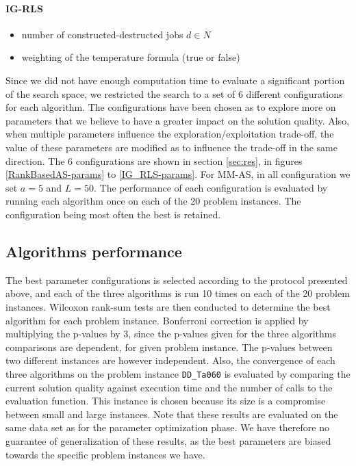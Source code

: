 \documentclass[runningheads]{llncs}
\begin{document}
\paragraph{IG-RLS}
\begin{itemize}
	\item number of constructed-destructed jobs $d\in N$
	\item weighting of the temperature formula (true or false)
\end{itemize}

Since we did not have enough computation time to evaluate a significant portion
of the search space, we restricted the search to a set of 6 different
configurations for each algorithm. The configurations have been chosen as to
explore more on parameters that we believe to have a greater impact on the
solution quality. Also, when multiple parameters influence the
exploration/exploitation trade-off, the value of these parameters are modified
as to influence the trade-off in the same direction. The 6 configurations are
shown in section \ref{sec:res}, in figures \ref{RankBasedAS-params} to
\ref{IG_RLS-params}. For MM-AS, in all configuration we set $a=5$ and $L=50$.
The performance of each configuration is evaluated by running each algorithm
once on each of the 20 problem instances. The configuration being most often the
best is retained.

\subsection{Algorithms performance}

The best parameter configurations is selected according to the protocol
presented above, and each of the three algorithms is run 10 times on each of the
20 problem instances. Wilcoxon rank-sum tests are then conducted to determine
the best algorithm for each problem instance. Bonferroni correction is applied
by multiplying the p-values by 3, since the p-values given for the three
algorithms comparisons are dependent, for  given problem instance. The p-values
between two different instances are however independent. Also, the convergence
of each three algorithms on the problem instance \texttt{DD\_Ta060} is evaluated
by comparing the current solution quality against execution time and the number
of calls to the evaluation function. This instance is chosen because its size is
a compromise between small and large instances. Note that these results are
evaluated on the same data set as for the parameter optimization phase. We have
therefore no guarantee of generalization of these results, as the best
parameters are biased towards the specific problem instances we have.
\end{document}
